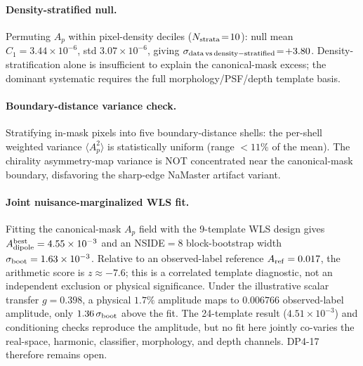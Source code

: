 \documentclass[aps,prd,twocolumn,superscriptaddress,preprintnumbers,nofootinbib,longbibliography,floatfix]{revtex4-2}
\begin{document}
\paragraph{Density-stratified null.}
Permuting $A_p$ within pixel-density deciles ($N_{\rm strata}\!=\!10$): null mean $C_1\!=\!3.44\!\times\!10^{-6}$, std $3.07\!\times\!10^{-6}$, giving $\sigma_{\rm data\,vs\,density-stratified}\!=\!+3.80$. Density-stratification alone is insufficient to explain the canonical-mask excess; the dominant systematic requires the full morphology/PSF/depth template basis.

\paragraph{Boundary-distance variance check.}
Stratifying in-mask pixels into five boundary-distance shells: the per-shell weighted variance $\langle A_p^2\rangle$ is statistically uniform (range $<\!11\%$ of the mean). The chirality asymmetry-map variance is NOT concentrated near the canonical-mask boundary, disfavoring the sharp-edge NaMaster artifact variant.

\paragraph{Joint nuisance-marginalized WLS fit.}
Fitting the canonical-mask $A_p$ field with the 9-template WLS design gives $A_{\rm dipole}^{\rm best}=4.55\times10^{-3}$ and an NSIDE$=8$ block-bootstrap width $\sigma_{\rm boot}=1.63\times10^{-3}$. Relative to an observed-label reference $A_{\rm ref}=0.017$, the arithmetic score is $z\approx-7.6$; this is a correlated template diagnostic, not an independent exclusion or physical significance. Under the illustrative scalar transfer $g=0.398$, a physical $1.7\%$ amplitude maps to $0.006766$ observed-label amplitude, only $1.36\,\sigma_{\rm boot}$ above the fit. The 24-template result ($4.51\times10^{-3}$) and conditioning checks reproduce the amplitude, but no fit here jointly co-varies the real-space, harmonic, classifier, morphology, and depth channels. DP4-17 therefore remains open.
\end{document}
